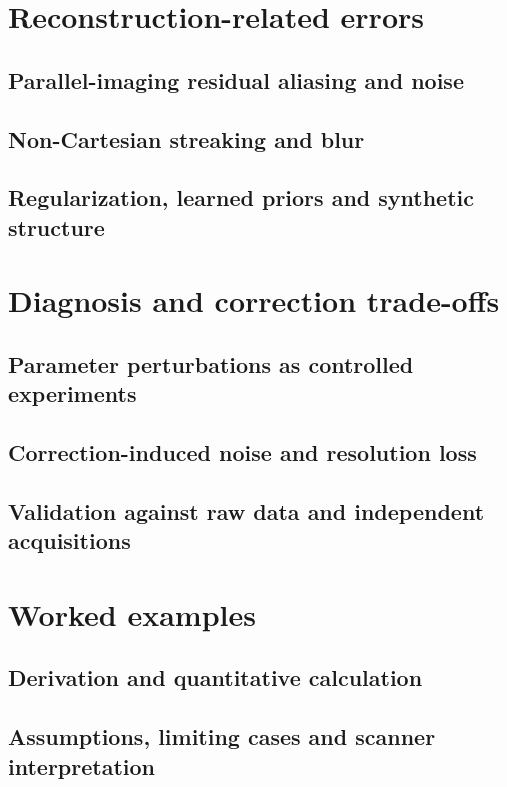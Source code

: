 \section{Reconstruction-related errors}
\label{sec:22:reconstruction-related-errors}
\subsection{Parallel-imaging residual aliasing and noise}
\subsection{Non-Cartesian streaking and blur}
\subsection{Regularization, learned priors and synthetic structure}

\section{Diagnosis and correction trade-offs}
\label{sec:22:diagnosis-and-correction-trade-offs}
\subsection{Parameter perturbations as controlled experiments}
\subsection{Correction-induced noise and resolution loss}
\subsection{Validation against raw data and independent acquisitions}

\section{Worked examples}
\label{sec:22:worked-examples}
\subsection{Derivation and quantitative calculation}
\subsection{Assumptions, limiting cases and scanner interpretation}


